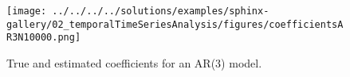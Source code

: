 \documentclass[12pt]{article}
\begin{document}
\begin{enumerate}
        \begin{figure}
            \begin{center}
                \texttt{[image: ../../../../solutions/examples/sphinx-gallery/02\_temporalTimeSeriesAnalysis/figures/coefficientsAR3N10000.png]}
            \end{center}
            \caption{True and estimated coefficients for an AR(3) model.}
            \label{fig:coefsAR3}
        \end{figure}

\end{enumerate}
\end{document}

